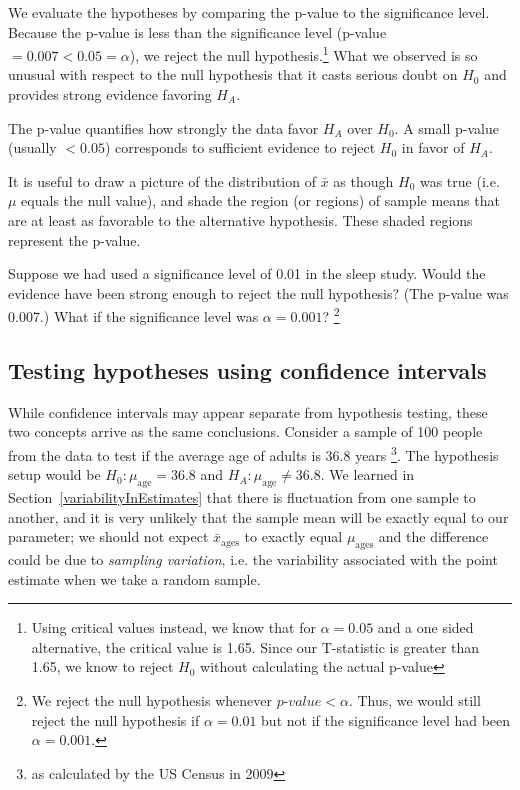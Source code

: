 We evaluate the hypotheses by comparing the p-value to the significance level. Because the p-value is less than the significance level (p-value $=0.007 < 0.05=\alpha$), we reject the null hypothesis.\footnote{Using critical values instead, we know that for $\alpha=0.05$ and a one sided alternative, the critical value is 1.65. Since our T-statistic is greater than 1.65, we know to reject $H_0$ without calculating the actual p-value} What we observed is so unusual with respect to the null hypothesis that it casts serious doubt on $H_0$ and provides strong evidence favoring $H_A$.

\begin{termBox}{
The p-value quantifies how strongly the data favor $H_A$ over $H_0$. A small p-value (usually $<0.05$) corresponds to sufficient evidence to reject $H_0$ in favor of $H_A$.}
\end{termBox}

\begin{tipBox}{
It is useful to draw a picture of the distribution of $\bar{x}$ as though $H_0$ was true (i.e. $\mu$ equals the null value), and shade the region (or regions) of sample means that are at least as favorable to the alternative hypothesis. These shaded regions represent the p-value.}
\end{tipBox}

\begin{exercise}
Suppose we had used a significance level of 0.01 in the sleep study. Would the evidence have been strong enough to reject the null hypothesis? (The p-value was 0.007.) What if the significance level was $\alpha = 0.001$? \footnote{We reject the null hypothesis whenever $p$-$value < \alpha$. Thus, we would still reject the null hypothesis if $\alpha = 0.01$ but not if the significance level had been $\alpha = 0.001$.}
\end{exercise}

\subsection{Testing hypotheses using confidence intervals}
\label{utilizingOurCI}

While confidence intervals may appear separate from hypothesis testing, these two concepts arrive as the same conclusions. Consider a sample of 100 people from the  data to test if the average age of adults is 36.8 years \footnote{as calculated by the US Census in 2009}. The hypothesis setup would be $H_0: \mu_{\mathrm{age}}=36.8$ and $H_A: \mu_{\mathrm{age}} \neq 36.8$. We learned in Section~\ref{variabilityInEstimates} that there is fluctuation from one sample to another, and it is very unlikely that the sample mean will be exactly equal to our parameter; we should not expect $\bar{x}_{\mathrm{ages}}$ to exactly equal $\mu_{\mathrm{ages}}$ and the difference could be due to \emph{sampling variation}, i.e. the variability associated with the point estimate when we take a random sample.

